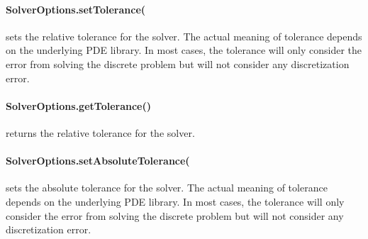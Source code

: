 %


%


%


%


\paragraph{SolverOptions.setTolerance(
}
sets the relative tolerance for the solver. The actual meaning of tolerance
depends on the underlying PDE library. In most cases, the tolerance
will only consider the error from solving the discrete problem but will
not consider any discretization error.


\paragraph{SolverOptions.getTolerance()}
returns the relative tolerance for the solver.


\paragraph{SolverOptions.setAbsoluteTolerance(
}
sets the absolute tolerance for the solver. The actual meaning of tolerance
depends on the underlying PDE library. In most cases, the tolerance
will only consider the error from solving the discrete problem but will
not consider any discretization error.


